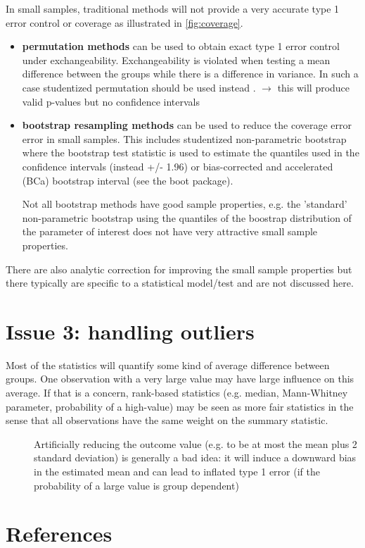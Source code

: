 \documentclass[12pt]{article}
\newcommand\Warning[1][3ex]{%
\renewcommand\stacktype{L}%
\scaleto{\stackon[1.3pt]{\color{red}$\triangle$}{\tiny\bfseries !}}{#1}%
\xspace
}
\begin{document}
In small samples, traditional methods will not provide a very accurate
type 1 error control or coverage as illustrated in
\autoref{fig:coverage}.
\begin{itemize}
\item \textbf{permutation methods} can be used to obtain exact type 1 error control
under exchangeability. Exchangeability is violated when
testing a mean difference between the groups while there is a
difference in variance. In such a case studentized permutation
should be used instead \citep{chung2016asymptotically}. \newline
\(\rightarrow\) this will produce valid p-values but no confidence
intervals
\item \textbf{bootstrap resampling methods} can be used to reduce the coverage
error error in small samples. This includes studentized
non-parametric bootstrap where the bootstrap test statistic is used
to estimate the quantiles used in the confidence intervals (instead
+/- 1.96) or bias-corrected and accelerated (BCa) bootstrap interval
(see the boot package). \newline \Warning Not all bootstrap methods
have good sample properties, e.g. the 'standard' non-parametric
bootstrap using the quantiles of the boostrap distribution of the
parameter of interest does not have very attractive small sample
properties.
\end{itemize}
There are also analytic correction for improving the small sample
properties but there typically are specific to a statistical
model/test and are not discussed here.

\section{Issue 3: handling outliers}
\label{sec:org78080f1}

Most of the statistics will quantify some kind of average difference
between groups. One observation with a very large value may have large
influence on this average. If that is a concern, rank-based statistics
(e.g. median, Mann-Whitney parameter, probability of a high-value) may
be seen as more fair statistics in the sense that all observations
have the same weight on the summary statistic.
\begin{description}
\item[{\Warning}] Artificially reducing the outcome value (e.g. to be at
most the mean plus 2 standard deviation) is generally a bad idea: it
will induce a downward bias in the estimated mean and can lead to
inflated type 1 error (if the probability of a large value is group
dependent)
\end{description}

\clearpage



\section{References}
\label{sec:org5860ce6}
\begingroup
\renewcommand{\section}[2]{}



\endgroup
\end{document}
